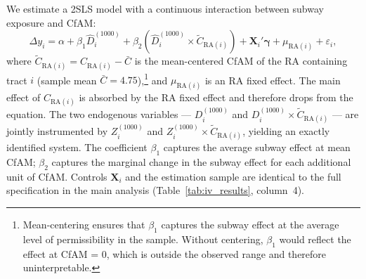 We estimate a 2SLS model with a continuous interaction between subway exposure and CfAM:
\begin{equation}
\Delta y_i = \alpha + \beta_1 \widehat{D}_i^{(1000)} + \beta_2 \left(\widehat{D}_i^{(1000)} \times \widetilde{C}_{\text{RA}(i)}\right) + \mathbf{X}_i'\boldsymbol{\gamma} + \mu_{\text{RA}(i)} + \varepsilon_i,
\label{eq:cfam_iv}
\end{equation}
where $\widetilde{C}_{\text{RA}(i)} = C_{\text{RA}(i)} - \bar{C}$ is the mean-centered CfAM of the RA containing tract $i$ (sample mean $\bar{C} = 4.75$),\footnote{Mean-centering ensures that $\beta_1$ captures the subway effect at the average level of permissibility in the sample. Without centering, $\beta_1$ would reflect the effect at CfAM = 0, which is outside the observed range and therefore uninterpretable.} and $\mu_{\text{RA}(i)}$ is an RA fixed effect. The main effect of $C_{\text{RA}(i)}$ is absorbed by the RA fixed effect and therefore drops from the equation. The two endogenous variables --- $D_i^{(1000)}$ and $D_i^{(1000)} \times \widetilde{C}_{\text{RA}(i)}$ --- are jointly instrumented by $Z_i^{(1000)}$ and $Z_i^{(1000)} \times \widetilde{C}_{\text{RA}(i)}$, yielding an exactly identified system. The coefficient $\beta_1$ captures the average subway effect at mean CfAM; $\beta_2$ captures the marginal change in the subway effect for each additional unit of CfAM. Controls $\mathbf{X}_i$ and the estimation sample are identical to the full specification in the main analysis (Table~\ref{tab:iv_results}, column~4).

